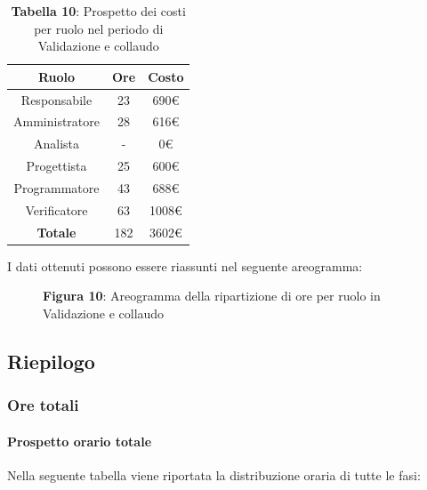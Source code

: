 \begin{table}[H]
	\centering
	\renewcommand{\arraystretch}{1.5}
	\begin{tabular}{|c|c|c|}
		\hline
		\rowcolor{lighter-grayer}
Ruolo & Ore & Costo \\ \hline
Responsabile & 23 & 690\euro \\ \hline
Amministratore & 28 & 616\euro \\ \hline
Analista & - & 0\euro \\ \hline
Progettista & 25 & 600\euro \\ \hline
Programmatore & 43 & 688\euro \\ \hline
Verificatore & 63 & 1008\euro \\ \hline
\textbf{Totale} & 182 & 3602\euro \\ \hline
	\end{tabular}
\caption*{\textbf{Tabella 10}: Prospetto dei costi per ruolo nel periodo di Validazione e collaudo\\}
\end{table}

I dati ottenuti possono essere riassunti nel seguente areogramma:


\begin{figure}[H]
	\centering
	\caption*{\textbf{Figura 10}: Areogramma della ripartizione di ore per ruolo in Validazione e collaudo}
	\label{fig:Figura10}
\end{figure}

\subsection{Riepilogo}
\subsubsection{Ore totali}
\paragraph{Prospetto orario totale}
Nella seguente tabella viene riportata la distribuzione oraria di tutte le fasi:

